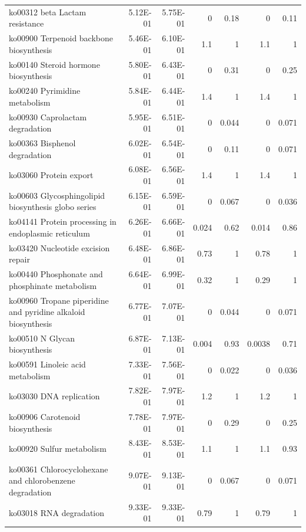 {\begin{longtable}{ | l | r | r | r | r | r | r  | }
		ko00312 beta Lactam resistance & 5.12E-01 & 5.75E-01 & 0 & 0.18 & 0 & 0.11 \\ 
		ko00900 Terpenoid backbone biosynthesis & 5.46E-01 & 6.10E-01 & 1.1 & 1 & 1.1 & 1 \\ 
		ko00140 Steroid hormone biosynthesis & 5.80E-01 & 6.43E-01 & 0 & 0.31 & 0 & 0.25 \\ 
		ko00240 Pyrimidine metabolism & 5.84E-01 & 6.44E-01 & 1.4 & 1 & 1.4 & 1 \\ 
		ko00930 Caprolactam degradation & 5.95E-01 & 6.51E-01 & 0 & 0.044 & 0 & 0.071 \\ 
		ko00363 Bisphenol degradation & 6.02E-01 & 6.54E-01 & 0 & 0.11 & 0 & 0.071 \\ 
		ko03060 Protein export & 6.08E-01 & 6.56E-01 & 1.4 & 1 & 1.4 & 1 \\ 
		ko00603 Glycosphingolipid biosynthesis globo series & 6.15E-01 & 6.59E-01 & 0 & 0.067 & 0 & 0.036 \\ 
		ko04141 Protein processing in endoplasmic reticulum & 6.26E-01 & 6.66E-01 & 0.024 & 0.62 & 0.014 & 0.86 \\ 
		ko03420 Nucleotide excision repair & 6.48E-01 & 6.86E-01 & 0.73 & 1 & 0.78 & 1 \\ 
		ko00440 Phosphonate and phosphinate metabolism & 6.64E-01 & 6.99E-01 & 0.32 & 1 & 0.29 & 1 \\ 
		ko00960 Tropane piperidine and pyridine alkaloid biosynthesis & 6.77E-01 & 7.07E-01 & 0 & 0.044 & 0 & 0.071 \\ 
		ko00510 N Glycan biosynthesis & 6.87E-01 & 7.13E-01 & 0.004 & 0.93 & 0.0038 & 0.71 \\ 
		ko00591 Linoleic acid metabolism & 7.33E-01 & 7.56E-01 & 0 & 0.022 & 0 & 0.036 \\ 
		ko03030 DNA replication & 7.82E-01 & 7.97E-01 & 1.2 & 1 & 1.2 & 1 \\ 
		ko00906 Carotenoid biosynthesis & 7.78E-01 & 7.97E-01 & 0 & 0.29 & 0 & 0.25 \\ 
		ko00920 Sulfur metabolism & 8.43E-01 & 8.53E-01 & 1.1 & 1 & 1.1 & 0.93 \\ 
		ko00361 Chlorocyclohexane and chlorobenzene degradation & 9.07E-01 & 9.13E-01 & 0 & 0.067 & 0 & 0.071 \\ 
		ko03018 RNA degradation & 9.33E-01 & 9.33E-01 & 0.79 & 1 & 0.79 & 1
		
	\end{longtable}
}







